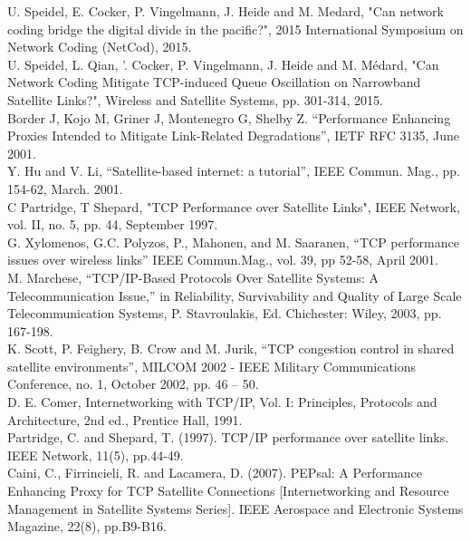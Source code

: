 \documentclass{uathesis}
\begin{document}
\noindent [4]U. Speidel, E. Cocker, P. Vingelmann, J. Heide and M. Medard, "Can network coding bridge the digital divide in the pacific?", 2015 International Symposium on Network Coding (NetCod), 2015.\\

\noindent [5]U. Speidel, L. Qian, ’. Cocker, P. Vingelmann, J. Heide and M. Médard, "Can Network Coding Mitigate TCP-induced Queue Oscillation on Narrowband Satellite Links?", Wireless and Satellite Systems, pp. 301-314, 2015.\\

\noindent [6] Border J, Kojo M, Griner J, Montenegro G, Shelby Z. “Performance Enhancing Proxies Intended to Mitigate Link-Related Degradations”, IETF RFC 3135, June 2001.\\

\noindent [7] Y. Hu and V. Li, “Satellite-based internet: a tutorial”, IEEE Commun. Mag., pp. 154-62, March. 2001.\\

\noindent [8] C Partridge, T Shepard, "TCP Performance over Satellite Links", IEEE Network, vol. II, no. 5, pp. 44, September 1997.\\

\noindent [9] G. Xylomenos, G.C. Polyzos, P., Mahonen, and M. Saaranen, “TCP performance issues over wireless links” IEEE Commun.Mag., vol. 39, pp 52-58, April 2001.\\

\noindent [10] M. Marchese, “TCP/IP-Based Protocols Over Satellite Systems: A Telecommunication Issue,” in Reliability, Survivability and Quality of Large Scale Telecommunication Systems, P. Stavroulakis, Ed. Chichester: Wiley, 2003, pp. 167-198.\\

\noindent [11] K. Scott, P. Feighery, B. Crow and M. Jurik, “TCP congestion control in shared satellite environments”, MILCOM 2002 - IEEE Military Communications Conference, no. 1, October 2002, pp. 46 – 50.  \\

\noindent [12] D. E. Comer, Internetworking with TCP/IP, Vol. I: Principles, Protocols and Architecture, 2nd ed., Prentice Hall, 1991. \\

\noindent [13 Ref3] Partridge, C. and Shepard, T. (1997). TCP/IP performance over satellite links. IEEE Network, 11(5), pp.44-49.\\

\noindent [14 Pepsal] Caini, C., Firrincieli, R. and Lacamera, D. (2007). PEPsal: A Performance Enhancing Proxy for TCP Satellite Connections [Internetworking and Resource Management in Satellite Systems Series]. IEEE Aerospace and Electronic Systems Magazine, 22(8), pp.B9-B16.\\
\end{document}

